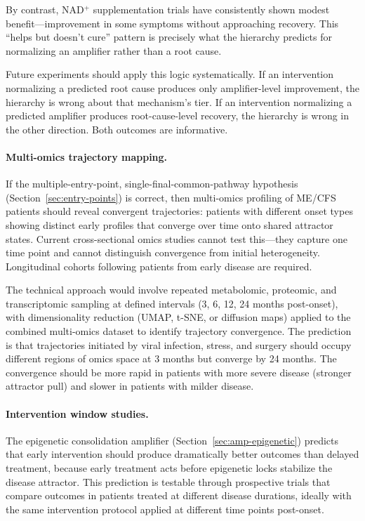 By contrast, NAD$^+$ supplementation trials have consistently shown modest benefit---improvement in some symptoms without approaching recovery. This ``helps but doesn't cure'' pattern is precisely what the hierarchy predicts for normalizing an amplifier rather than a root cause.

Future experiments should apply this logic systematically. If an intervention normalizing a predicted root cause produces only amplifier-level improvement, the hierarchy is wrong about that mechanism's tier. If an intervention normalizing a predicted amplifier produces root-cause-level recovery, the hierarchy is wrong in the other direction. Both outcomes are informative.

\paragraph{Multi-omics trajectory mapping.} If the multiple-entry-point, single-final-common-pathway hypothesis (Section~\ref{sec:entry-points}) is correct, then multi-omics profiling of ME/CFS patients should reveal convergent trajectories: patients with different onset types showing distinct early profiles that converge over time onto shared attractor states. Current cross-sectional omics studies cannot test this---they capture one time point and cannot distinguish convergence from initial heterogeneity. Longitudinal cohorts following patients from early disease are required.

The technical approach would involve repeated metabolomic, proteomic, and transcriptomic sampling at defined intervals (3, 6, 12, 24 months post-onset), with dimensionality reduction (UMAP, t-SNE, or diffusion maps) applied to the combined multi-omics dataset to identify trajectory convergence. The prediction is that trajectories initiated by viral infection, stress, and surgery should occupy different regions of omics space at 3 months but converge by 24 months. The convergence should be more rapid in patients with more severe disease (stronger attractor pull) and slower in patients with milder disease.

\paragraph{Intervention window studies.} The epigenetic consolidation amplifier (Section~\ref{sec:amp-epigenetic}) predicts that early intervention should produce dramatically better outcomes than delayed treatment, because early treatment acts before epigenetic locks stabilize the disease attractor. This prediction is testable through prospective trials that compare outcomes in patients treated at different disease durations, ideally with the same intervention protocol applied at different time points post-onset.

